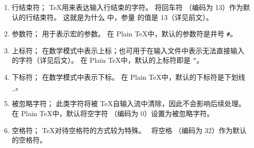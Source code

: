 \documentclass{book}
\begin{document}
\begin{enumerate}
\item{}\label{ini:eol}行结束符；
        \TeX 用来表达输入行结束的字符。
        \IniTeX 将回车符 （\ascii 编码为 13）作为默认的行结束符。
        这就是为什么 \IniTeX 中，参量  的值是 13（详见前文）。
\item{}参数符；
        用于表示宏的参数。
        在 Plain \TeX 中，默认的参数符是井号 \verb-#-。
\item{}上标符；
        在数学模式中表示上标；也可用于在输入文件中表示无法直接输入的字符（详见后文）。
        在 Plain \TeX 中，默认的上标符即是 \verb_^_。
\item{}下标符；
        在数学模式中表示下标。
        在 Plain \TeX 中，默认的下标符是下划线 \verb-_-。
\item{}被忽略字符；
        此类字符将被 \TeX 自输入流中清除，因此不会影响后续处理。
        在 Plain \TeX 中，默认将空字符 （\ascii 编码为 0）设置为被忽略字符。
\item{}\label{ini:sp}空格符；
        \TeX 对待空格符的方式较为特殊。
        \IniTeX\ 将空格 （\ascii 编码为 32）作为默认的空格符。

\end{enumerate}
\end{document}
